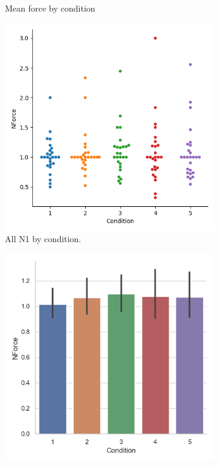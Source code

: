 \begin{figure}[H]
\begin{subfigure}[b]{0.4\textwidth}
         \caption{Mean force by condition}
         \label{fig:allForceMeanCond}
     \end{subfigure}          
     \hspace*{\fill}
     \begin{subfigure}[b]{0.4\textwidth}
         \centering
         \includegraphics[width=\textwidth]{Files/Plots/forceNforce_by_cond_swarm.png}
         \caption{All N1 by condition. }
         \label{fig:allForceNCond}
     \end{subfigure}
     \hspace*{\fill}
     \begin{subfigure}[b]{0.4\textwidth}
         \centering
         \includegraphics[width=\textwidth]{Files/Plots/forceNforce_mean_by_condition.png}

\end{subfigure}
\end{figure}
